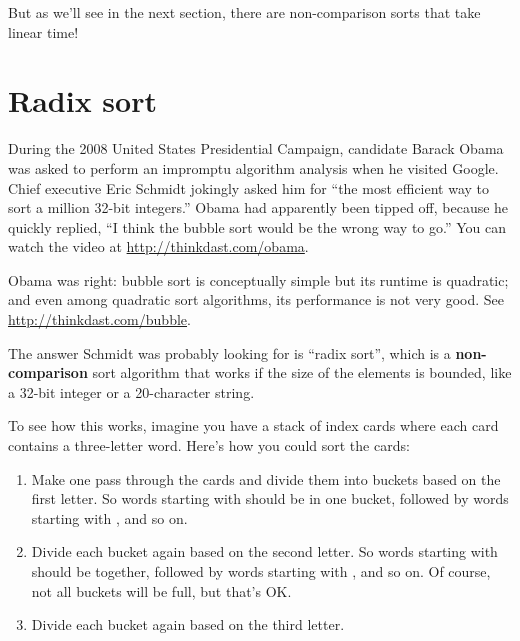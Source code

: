 \documentclass[12pt]{book}
\theoremstyle{exercise}
\begin{document}
But as we'll see in the next section, there are non-comparison sorts
that take linear time!



\section{Radix sort}
\label{radix-sort}


During the 2008 United States Presidential Campaign, candidate Barack
Obama was asked to perform an impromptu algorithm analysis when he
visited Google. Chief executive Eric Schmidt jokingly asked him for
``the most efficient way to sort a million 32-bit integers.'' Obama
had apparently been tipped off, because he quickly replied, ``I think
the bubble sort would be the wrong way to go.'' You can watch the
video at \url{http://thinkdast.com/obama}.

Obama was right: bubble sort is conceptually simple but its runtime is
quadratic; and even among quadratic sort algorithms, its performance
is not very good.  See \url{http://thinkdast.com/bubble}.


The answer Schmidt was probably looking for is ``radix sort'', which is
a {\bf non-comparison} sort algorithm that works if the size of the
elements is bounded, like a 32-bit integer or a 20-character string.


To see how this works, imagine you have a stack of index cards where
each card contains a three-letter word. Here's how you could sort the
cards:

\begin{enumerate}

\item
  Make one pass through the cards and divide them into buckets based on
  the first letter. So words starting with  should be
  in one bucket, followed by words starting with , and so on.

\item
  Divide each bucket again based on the second letter. So words starting
  with  should be together, followed by words starting with
  , and so on. Of course, not all buckets will be full, but
  that's OK.

\item
  Divide each bucket again based on the third letter.

\end{enumerate}
\end{document}
